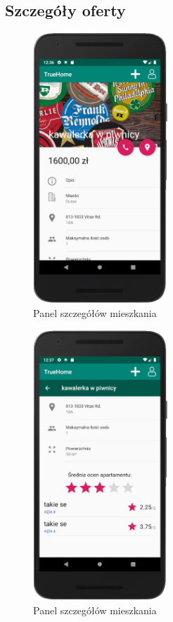 \documentclass[polish, 11pt]{article}
\begin{document}
       \subsection{Szczegóły oferty}
        \begin{figure}[H]
                    \centering
                    \includegraphics[width=0.45\textwidth]{aplikacja/details.png}
                    \caption{Panel szczegółów mieszkania}
        \end{figure}
        \begin{figure}[H]
                    \centering
                    \includegraphics[width=0.45\textwidth]{aplikacja/details2.png}
                    \caption{Panel szczegółów mieszkania}
        \end{figure}
        
\end{document}
